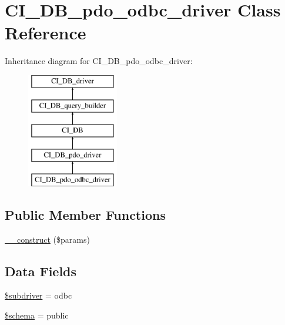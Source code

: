 \hypertarget{class_c_i___d_b__pdo__odbc__driver}{}\section{C\+I\+\_\+\+D\+B\+\_\+pdo\+\_\+odbc\+\_\+driver Class Reference}
\label{class_c_i___d_b__pdo__odbc__driver}
Inheritance diagram for C\+I\+\_\+\+D\+B\+\_\+pdo\+\_\+odbc\+\_\+driver\+:\begin{figure}[H]
\begin{center}
\leavevmode
\includegraphics[height=5.000000cm]{class_c_i___d_b__pdo__odbc__driver}
\end{center}
\end{figure}
\subsection*{Public Member Functions}
\begin{DoxyCompactItemize}
\item 
\hyperlink{class_c_i___d_b__pdo__odbc__driver_a9162320adff1a1a4afd7f2372f753a3e}{\+\_\+\+\_\+construct} (\$params)
\end{DoxyCompactItemize}
\subsection*{Data Fields}
\begin{DoxyCompactItemize}
\item 
\hyperlink{class_c_i___d_b__pdo__odbc__driver_a1322ca756348b11d080cb7a4f590de15}{\$subdriver} = \textquotesingle{}odbc\textquotesingle{}
\item 
\hyperlink{class_c_i___d_b__pdo__odbc__driver_a83022b1d70799d2bde3d64dca9cb40ee}{\$schema} = \textquotesingle{}public\textquotesingle{}
\end{DoxyCompactItemize}
